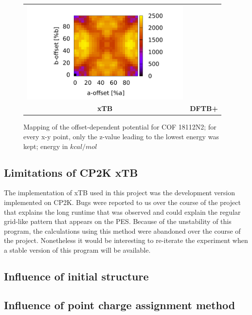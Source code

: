 \begin{figure}[H]
{\begin{tabular}{cc}
\includegraphics[trim={2cm 0cm 1.9cm 0.4cm},clip,width=8.5cm]{images/DFTB_all_18112N2_map.pdf} \\ 
\textbf{\Large{xTB}}\par\medskip & \textbf{\Large{DFTB+}}\par\medskip\\
\end{tabular}}
\caption{Mapping of the offset-dependent potential for COF 18112N2; for every x-y point, only the z-value leading to the lowest energy was kept; energy in $kcal/mol$}
\label{fig:18maps}
\end{figure}



\subsection{Limitations of CP2K xTB}
\label{sec:xTB_fail}
The implementation of xTB used in this project was the development version implemented on CP2K. Bugs were reported to us over the course of the project that explains the long runtime that was observed and could explain the regular grid-like pattern that appears on the PES. Because of the unstability of this program, the calculations using this method were abandoned over the course of the project. Nonetheless it would be interesting to re-iterate the experiment when a stable version of this program will be available.

\subsection{Influence of initial structure}

\subsection{Influence of point charge assignment method}

